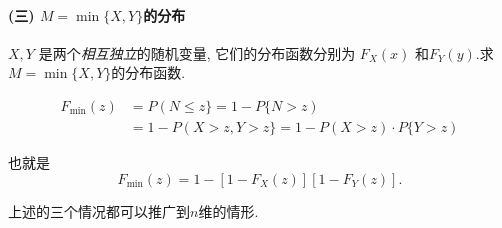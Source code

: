 \paragraph{(三) $M=\min \{X, Y\}$的分布}

$X, Y$ 是两个\emph{相互独立}的随机变量, 它们的分布函数分别为 $F_X(x)$ 和$F_Y(y)$.求 $M=\min \{X, Y\}$的分布函数.


   $$
\begin{aligned}
F_{\min }(z) & =P(N \leq z\}=1-P\{N>z) \\
& =1-P(X>z, Y>z\}=1-P(X>z) \cdot P\{Y>z)
\end{aligned}
$$

也就是
$$
F_{\min }(z)=1-\left[1-F_X(z)\right]\left[1-F_Y(z)\right] .
$$

上述的三个情况都可以推广到$n$维的情形.